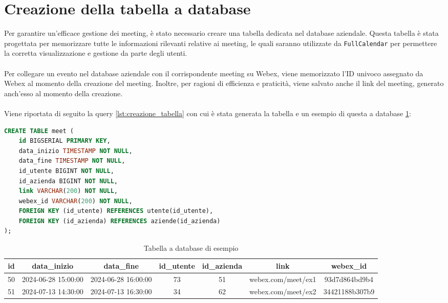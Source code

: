 \section{Creazione della tabella a database}
Per garantire un'efficace gestione dei meeting, è stato necessario creare una tabella dedicata nel database aziendale.
Questa tabella è stata progettata per memorizzare tutte le informazioni rilevanti relative ai meeting, le quali
saranno utilizzate da \texttt{FullCalendar} \cite{FullCalendarSite} per permettere la corretta visualizzazione e gestione 
da parte degli utenti.
\\
\\
Per collegare un evento nel database aziendale con il corrispondente meeting su Webex, viene memorizzato l'ID 
univoco assegnato da Webex al momento della creazione del meeting. Inoltre, per ragioni di efficienza e praticità, 
viene salvato anche il link del meeting, generato anch'esso al momento della creazione.
\\
\\
Viene riportata di seguito la query \ref{lst:creazione_tabella} con cui è stata generata la tabella
e un esempio di questa a database \ref{tbl:esempio_tabella_database}:
\begin{lstlisting}[language=SQL, frame=lines, caption={query creazione tabella}, label={lst:creazione_tabella}]
CREATE TABLE meet (
    id BIGSERIAL PRIMARY KEY,
    data_inizio TIMESTAMP NOT NULL,
    data_fine TIMESTAMP NOT NULL,
    id_utente BIGINT NOT NULL,
    id_azienda BIGINT NOT NULL,
    link VARCHAR(200) NOT NULL,
    webex_id VARCHAR(200) NOT NULL,
    FOREIGN KEY (id_utente) REFERENCES utente(id_utente),
    FOREIGN KEY (id_azienda) REFERENCES aziende(id_azienda)
);
\end{lstlisting}
\begin{table}[ht]
    \centering
    \begin{adjustbox}{width=13cm, center}
    \begin{tabular}{|c|c|c|c|c|c|c|}
        \hline
        \rowcolor{gray!30}
        id & data\_inizio & data\_fine & id\_utente & id\_azienda & link & webex\_id \\
        \hline
        50 & 2024-06-28 15:00:00 & 2024-06-28 16:00:00 & 73 & 51 & webex.com\//meet\//ex1 & 93d7d864bd9b4 \\
        \hline
        51 & 2024-07-13 14:30:00 & 2024-07-13 16:30:00 & 34 & 62 & webex.com\//meet\//ex2 & 34421188b307b9\\
        \hline
    \end{tabular}
    \end{adjustbox}
    \caption{Tabella a database di esempio}
    \label{tbl:esempio_tabella_database}
\end{table}

